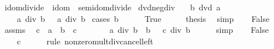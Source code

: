 \begin{isabellebody}
%
\isadelimproof
\isanewline
%
\endisadelimproof
\isanewline
{}\isamarkupfalse%
\isanewline
\isanewline
{}\isamarkupfalse%
\ idom{\isacharunderscore}{\kern0pt}divide\ {\isacharequal}{\kern0pt}\ idom\ {\isacharplus}{\kern0pt}\ semidom{\isacharunderscore}{\kern0pt}divide\isanewline
{}\isanewline
\isanewline
{}\isamarkupfalse%
\ dvd{\isacharunderscore}{\kern0pt}neg{\isacharunderscore}{\kern0pt}div{\isacharcolon}{\kern0pt}\isanewline
\ \ \ {\isachardoublequoteopen}b\ dvd\ a{\isachardoublequoteclose}\isanewline
\ \ \ {\isachardoublequoteopen}{\isacharminus}{\kern0pt}\ a\ div\ b\ {\isacharequal}{\kern0pt}\ {\isacharminus}{\kern0pt}\ {\isacharparenleft}{\kern0pt}a\ div\ b{\isacharparenright}{\kern0pt}{\isachardoublequoteclose}\isanewline
%
\isadelimproof
%
\endisadelimproof
%
\isatagproof
{}\isamarkupfalse%
\ {\isacharparenleft}{\kern0pt}cases\ {\isachardoublequoteopen}b\ {\isacharequal}{\kern0pt}\ {}{\isachardoublequoteclose}{\isacharparenright}{\kern0pt}\isanewline
\ \ \isamarkupfalse%
\ True\isanewline
\ \ \isamarkupfalse%
\ \isamarkupfalse%
\ {\isacharquery}{\kern0pt}thesis\ \isamarkupfalse%
\ simp\isanewline
{}\isamarkupfalse%
\isanewline
\ \ \isamarkupfalse%
\ False\isanewline
\ \ \isamarkupfalse%
\ assms\ \isamarkupfalse%
\ c\ \ {\isachardoublequoteopen}a\ {\isacharequal}{\kern0pt}\ b\ {\isacharasterisk}{\kern0pt}\ c{\isachardoublequoteclose}\ \isacommand{{\isachardot}{\kern0pt}{\isachardot}{\kern0pt}}\isamarkupfalse%
\isanewline
\ \ \isamarkupfalse%
\ \isamarkupfalse%
\ {\isachardoublequoteopen}{\isacharminus}{\kern0pt}\ a\ div\ b\ {\isacharequal}{\kern0pt}\ {\isacharparenleft}{\kern0pt}b\ {\isacharasterisk}{\kern0pt}\ {\isacharminus}{\kern0pt}\ c{\isacharparenright}{\kern0pt}\ div\ b{\isachardoublequoteclose}\isanewline
\ \ \ \ \isamarkupfalse%
\ simp\isanewline
\ \ \isamarkupfalse%
\ False\ \isamarkupfalse%
\ \isamarkupfalse%
\ {\isachardoublequoteopen}{\isasymdots}\ {\isacharequal}{\kern0pt}\ {\isacharminus}{\kern0pt}\ c{\isachardoublequoteclose}\isanewline
\ \ \ \ \isamarkupfalse%
\ {\isacharparenleft}{\kern0pt}rule\ nonzero{\isacharunderscore}{\kern0pt}mult{\isacharunderscore}{\kern0pt}div{\isacharunderscore}{\kern0pt}cancel{\isacharunderscore}{\kern0pt}left{\isacharparenright}{\kern0pt}\ \ \isanewline

\end{isabellebody}
